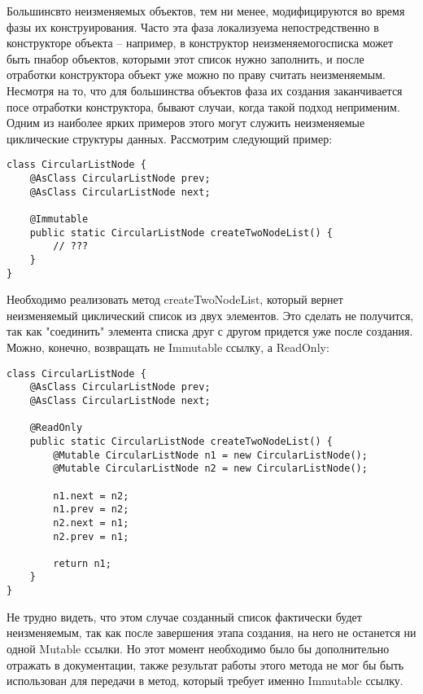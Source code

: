 Большинсвто неизменяемых объектов, тем ни менее, модифицируются во время фазы их конструирования. Часто эта фаза локализуема непостредственно в конструкторе объекта -- например, в конструктор неизменяемогосписка может быть пнабор объектов, которыми этот список нужно заполнить, и после отработки конструктора объект уже можно по праву считать неизменяемым. Несмотря на то, что для большинства объектов фаза их создания заканчивается посе отработки конструктора, бывают случаи, когда такой подход неприменим. Одним из наиболее ярких примеров этого могут служить неизменяемые циклические структуры данных. Рассмотрим следующий пример:

\begin{lstlisting}[caption=CircularListNode.java, label=code:circular_list_node]
class CircularListNode {
    @AsClass CircularListNode prev;
    @AsClass CircularListNode next;
    
    @Immutable
    public static CircularListNode createTwoNodeList() {
    	// ???
    }
}
\end{lstlisting} 

Необходимо реализовать метод createTwoNodeList, который вернет неизменяемый циклический список из двух элементов. Это сделать не получится, так как "соединить" элемента списка друг с другом придется уже после создания. Можно, конечно, возвращать не Immutable ссылку, а ReadOnly:
 
\begin{lstlisting}[caption=CircularListNode.java, label=code:circular_list_node_ro]
class CircularListNode {
    @AsClass CircularListNode prev;
    @AsClass CircularListNode next;
    
    @ReadOnly
    public static CircularListNode createTwoNodeList() {
    	@Mutable CircularListNode n1 = new CircularListNode();
        @Mutable CircularListNode n2 = new CircularListNode();
    	
        n1.next = n2;
        n1.prev = n2;
        n2.next = n1;
        n2.prev = n1;
    
        return n1;  
    }
}
\end{lstlisting} 

Не трудно видеть, что этом случае созданный список фактически будет неизменяемым, так как после завершения этапа создания, на него не останется ни одной Mutable ссылки. Но этот момент необходимо было бы дополнительно отражать в документации, также результат работы этого метода не мог бы быть использован для передачи в метод, который требует именно Immutable ссылку. 

